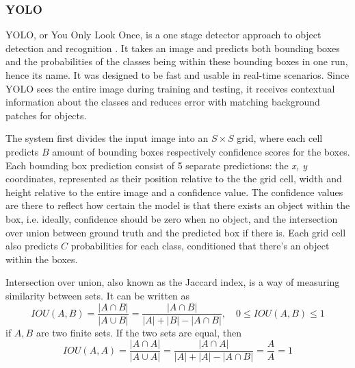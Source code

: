 \subsubsection{YOLO}
YOLO, or You Only Look Once, is a one stage detector approach to object detection and
 recognition \cite{YOLO1}. It takes an image and predicts both bounding boxes and the probabilities of the classes being within these bounding boxes in one run, hence its name. It was designed to be fast and usable in real-time scenarios. Since YOLO sees the entire image during training and testing, it receives contextual information about the classes and reduces error with matching background patches for objects. 
 
 The system first divides the input image into an  $S \times S$  grid, where each cell predicts $B$ amount of bounding boxes respectively confidence scores for the boxes. Each bounding box prediction consist of 5 separate predictions: the \textit{x, y} coordinates, represented as their position relative to the the grid cell, width and height relative to the entire image and a confidence value. The confidence values are there to reflect how certain the model is that there exists an object within the box, i.e. ideally, confidence should be zero when no object, and the intersection over union between ground truth and the predicted box if there is. Each grid cell also predicts $C$ probabilities for each class, conditioned that there's an object within the boxes. 
 
 Intersection over union, also known as the Jaccard index, is a way of measuring similarity between sets. It can be written as 
 \[
IOU(A,B) =  \frac{|A\cap B |}{|A\cup B|} =\frac{|A\cap B|}{|A| + |B| - |A \cap B|}
, \quad 0\leq IOU(A,B) \leq 1
 \]
 if $A,B$ are two finite sets. If the two sets are equal, then \[ IOU(A,A) =  \frac{|A\cap A |}{|A\cup A|} = \frac{|A\cap A|}{|A| + |A| - |A \cap B|}  = \frac{A}{A} = 1 \]
 
